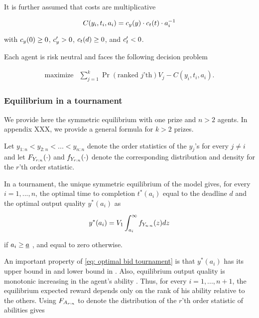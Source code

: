 It is further assumed that costs are multiplicative

\begin{equation}
  C(y_i, t_i, a_i) = \cscore (y) \cdot \ctime (t)  \cdot a_i^{-1}
\end{equation}

with \(\cscore(0)\geq 0\), \(\cscore^\prime>0\), \(\ctime(d)\geq 0\),
and \(\ctime^\prime<0\).

Each agent is risk neutral and faces the following decision problem

\begin{equation}
  \begin{array}{ll}
    \mbox{maximize} & \sum_{j=1}^k \Pr(\text{ranked $j$'th}) V_j  - C(y_i, t_i, a_i).
  \end{array}
\end{equation}

\subsubsection{Equilibrium in a
tournament}\label{equilibrium-in-a-tournament}

We provide here the symmetric equilibrium with one prize
 and \(n>2\) agents. In appendix XXX, we provide
a general formula for \(k>2\) prizes.

Let \(y_{1:n} < y_{2:n} < ... < y_{n:n}\) denote the order statistics of
the \(y_j\)'s for every \(j\neq i\) and let \(\pord[Y]{r}(\cdot)\) and
\(\dord[Y]{r}(\cdot)\) denote the corresponding distribution and density
for the \(r\)'th order statistic.

In a tournament, the unique symmetric equilibrium of the model gives,
for every \(i=1, ..., n\), the optimal time to completion \(t^*(a_i)\)
equal to the deadline \(d\) and the optimal output quality \(y^*(a_i)\)
as

\begin{equation}
  \label{eq: optimal bid tournament}
  y^*(a_i) =  V_1 \int_{a_i}^\infty \dord[Y]{n} (z) dz
\end{equation}

if \(\ability \geq \marginaltype\) \citep[see][]{moldovanu2001optimal},
and equal to zero otherwise.

An important property of \eqref{eq: optimal bid tournament} is that
\(y^*(a_i)\) has its upper bound in  and lower bound in
. Also, equilibrium output quality is monotonic increasing
in the agent's ability \citep[see][]{moldovanu2001optimal}. Thus, for
every \(i=1, ..., n+1\), the equilibrium expected reward depends only on
the rank of his ability relative to the others. Using \(\pord[A]{r}\) to
denote the distribution of the \(r\)'th order statistic of abilities
gives


